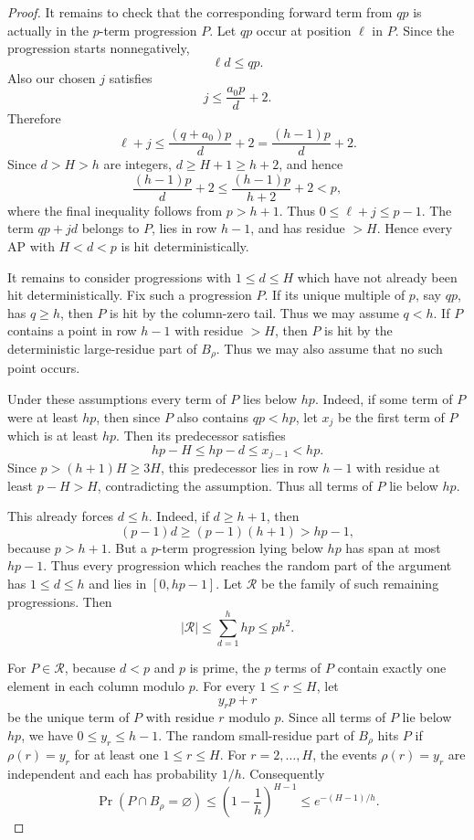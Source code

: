 \documentclass[11pt]{article}
\theoremstyle{remark}
\numberwithin{equation}{section}
\begin{document}
\begin{proof}
It remains to check that the corresponding forward term from $qp$ is actually in the $p$-term progression $P$.
Let $qp$ occur at position $\ell$ in $P$.
Since the progression starts nonnegatively,
\[
        \ell d\le qp.
\]
Also our chosen $j$ satisfies
\[
        j\le \frac{a_0p}{d}+2.
\]
Therefore
\[
        \ell+j
        \le
        \frac{(q+a_0)p}{d}+2
        =
        \frac{(h-1)p}{d}+2.
\]
Since $d>H>h$ are integers, $d\ge H+1\ge h+2$, and hence
\[
        \frac{(h-1)p}{d}+2
        \le
        \frac{(h-1)p}{h+2}+2
        <p,
\]
where the final inequality follows from $p>h+1$.
Thus $0\le\ell+j\le p-1$.
The term $qp+jd$ belongs to $P$, lies in row $h-1$, and has residue $>H$.
Hence every AP with $H<d<p$ is hit deterministically.

It remains to consider progressions with $1\le d\le H$ which have not already been hit deterministically.
Fix such a progression $P$.
If its unique multiple of $p$, say $qp$, has $q\ge h$, then $P$ is hit by the column-zero tail.
Thus we may assume $q<h$.
If $P$ contains a point in row $h-1$ with residue $>H$, then $P$ is hit by the deterministic large-residue part of $B_\rho$.
Thus we may also assume that no such point occurs.

Under these assumptions every term of $P$ lies below $hp$.
Indeed, if some term of $P$ were at least $hp$, then since $P$ also contains $qp<hp$, let $x_j$ be the first term of $P$ which is at least $hp$.
Then its predecessor satisfies
\[
        hp-H\le hp-d\le x_{j-1}<hp.
\]
Since $p>(h+1)H\ge3H$, this predecessor lies in row $h-1$ with residue at least $p-H>H$, contradicting the assumption.
Thus all terms of $P$ lie below $hp$.

This already forces $d\le h$.
Indeed, if $d\ge h+1$, then
\[
        (p-1)d\ge (p-1)(h+1)>hp-1,
\]
because $p>h+1$.
But a $p$-term progression lying below $hp$ has span at most $hp-1$.
Thus every progression which reaches the random part of the argument has $1\le d\le h$ and lies in $[0,hp-1]$.
Let $\mathcal R$ be the family of such remaining progressions.
Then
\begin{equation}\label{eq:remaining-ap-count}
        |\mathcal R|\le \sum_{d=1}^h hp\le p h^2.
\end{equation}

For $P\in\mathcal R$, because $d<p$ and $p$ is prime, the $p$ terms of $P$ contain exactly one element in each column modulo $p$.
For every $1\le r\le H$, let
\[
        y_rp+r
\]
be the unique term of $P$ with residue $r$ modulo $p$.
Since all terms of $P$ lie below $hp$, we have $0\le y_r\le h-1$.
The random small-residue part of $B_\rho$ hits $P$ if $\rho(r)=y_r$ for at least one $1\le r\le H$.
For $r=2,\ldots,H$, the events $\rho(r)=y_r$ are independent and each has probability $1/h$.
Consequently
\begin{equation}\label{eq:miss-probability}
        \Pr(P\cap B_\rho=\varnothing)
        \le
        \left(1-\frac1h\right)^{H-1}
        \le
        e^{-(H-1)/h}.
\end{equation}


\end{proof}
\end{document}
